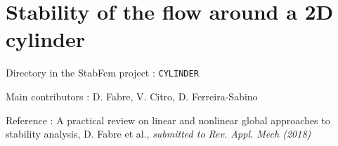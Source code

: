
\chapter{Stability of the flow around a 2D cylinder}

\begin{description}
\item{Directory in the StabFem project :}  \texttt{CYLINDER}
\item{Main contributors :} D. Fabre, V. Citro, D. Ferreira-Sabino
\item{Reference :} A practical review on linear and nonlinear global approaches to stability analysis, D. Fabre et al., {\em submitted to Rev. Appl. Mech (2018)}
\end{description}